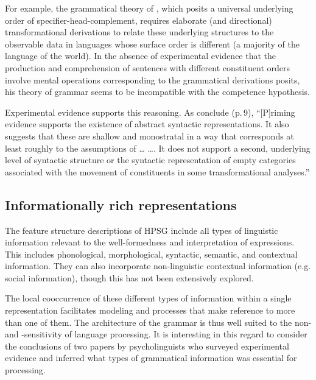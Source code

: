 \documentclass[output=paper
                ,modfonts
                ,nonflat
	        ,collection
	        ,collectionchapter
	        ,collectiontoclongg
 	        ,biblatex
                ,babelshorthands
                ,newtxmath
                ,draftmode
                ,colorlinks, citecolor=brown
]{./langsci/langscibook}
\begin{document}
For example, the grammatical theory of \citet{Kayne94a-u}, which posits a universal underlying order of specifier-head-complement, requires elaborate (and directional) transformational derivations to
relate these underlying structures to the observable data in languages whose surface order is different (a majority of the language of the world).  In the absence of experimental evidence that
the production and comprehension of sentences with different constituent orders involve mental operations corresponding to the grammatical derivations \citeauthor{Kayne94a-u} posits, his theory of grammar seems to be incompatible with the competence hypothesis.

Experimental evidence supports this reasoning.  As \citet{BraniganPickering2017} conclude (p.\,9), ``[P]riming evidence supports the existence of abstract syntactic representations. It also suggests
that these are shallow and monostratal in a way that corresponds at least roughly to the assumptions of \ldots{} \citet{ps2} \ldots{}. It does not support a second, underlying level of syntactic
structure or the syntactic representation of empty categories associated with the movement of constituents in some transformational analyses.''

\subsection{Informationally rich representations}

The feature structure descriptions of HPSG include all types of linguistic information relevant to the well-formedness and interpretation of expressions. This includes phonological, morphological, syntactic, semantic, and contextual information.  They can also incorporate non-linguistic contextual information (e.g. social information), though this has not been extensively explored.

The local cooccurrence of these different types of information within a single representation facilitates modeling  and  processes that make reference to more than one of them.  The architecture of the grammar is thus well suited to the non- and -sensitivity of language processing.  It is interesting in this regard to consider the conclusions of two papers by psycholinguists who surveyed experimental evidence and inferred what types of grammatical information was essential for processing.  
\end{document}
